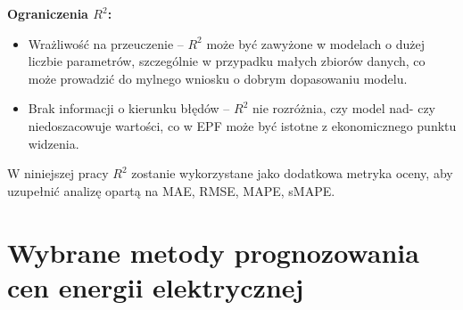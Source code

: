 \textbf{Ograniczenia \( R^2 \):}
\begin{itemize}
    \item Wrażliwość na przeuczenie -- \( R^2 \) może być zawyżone w modelach o dużej liczbie parametrów, szczególnie w przypadku małych zbiorów danych, co może prowadzić do mylnego wniosku o dobrym dopasowaniu modelu.
    \item Brak informacji o kierunku błędów -- \( R^2 \) nie rozróżnia, czy model nad- czy niedoszacowuje wartości, co w EPF może być istotne z ekonomicznego punktu widzenia.
\end{itemize}

W niniejszej pracy \( R^2 \) zostanie wykorzystane jako dodatkowa metryka oceny, aby uzupełnić analizę opartą na MAE, RMSE, MAPE, sMAPE.

\section{Wybrane metody prognozowania cen energii elektrycznej}
\label{sec:wybrane_metody_prognozowania_cen_energii_elektrycznej}